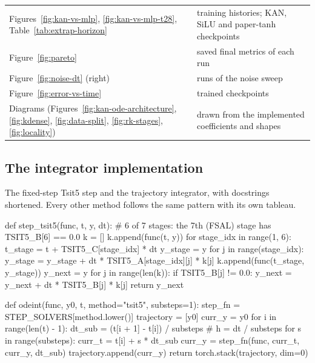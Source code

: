 \begin{table}[t]
\begin{tabularx}{\columnwidth}{@{}L{4.1cm} Y@{}}
Figures~\ref{fig:kan-vs-mlp}, \ref{fig:kan-vs-mlp-t28}, Table~\ref{tab:extrap-horizon} & training histories; KAN, SiLU and paper-tanh checkpoints\\
Figure~\ref{fig:pareto} & saved final metrics of each run\\
Figure~\ref{fig:noise-dt} (right) & runs of the noise sweep\\
Figure~\ref{fig:error-vs-time} & trained checkpoints\\
Diagrams (Figures~\ref{fig:kan-ode-architecture}, \ref{fig:kdense}, \ref{fig:data-split}, \ref{fig:rk-stages}, \ref{fig:locality}) & drawn from the implemented coefficients and shapes\\
\bottomrule
\end{tabularx}
\end{table}

\subsection{The integrator implementation}

The fixed-step Tsit5 step and the trajectory integrator, with docstrings
shortened. Every other method follows the same pattern with its own
tableau.

\begin{pycode}
def step_tsit5(func, t, y, dt):
    # 6 of 7 stages: the 7th (FSAL) stage has TSIT5_B[6] == 0.0
    k = []
    k.append(func(t, y))
    for stage_idx in range(1, 6):
        t_stage = t + TSIT5_C[stage_idx] * dt
        y_stage = y
        for j in range(stage_idx):
            y_stage = y_stage + dt * TSIT5_A[stage_idx][j] * k[j]
        k.append(func(t_stage, y_stage))
    y_next = y
    for j in range(len(k)):
        if TSIT5_B[j] != 0.0:
            y_next = y_next + dt * TSIT5_B[j] * k[j]
    return y_next
\end{pycode}

\begin{pycode}
def odeint(func, y0, t, method="tsit5", substeps=1):
    step_fn = STEP_SOLVERS[method.lower()]
    trajectory = [y0]
    curr_y = y0
    for i in range(len(t) - 1):
        dt_sub = (t[i + 1] - t[i]) / substeps     # h = dt / substeps
        for s in range(substeps):
            curr_t = t[i] + s * dt_sub
            curr_y = step_fn(func, curr_t, curr_y, dt_sub)
        trajectory.append(curr_y)
    return torch.stack(trajectory, dim=0)
\end{pycode}

